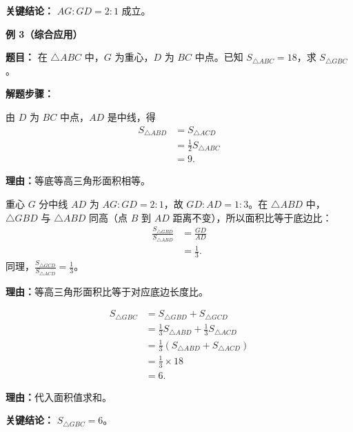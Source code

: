 \begin{examplebox}
	\textbf{\textcolor{CExample}{关键结论：}}
	\(AG:GD=2:1\) 成立。

	\medskip
	\textbf{\textcolor{CExample}{例 3（综合应用）}}

	\textbf{\textcolor{CExample}{题目：}}
	在 \(\triangle ABC\) 中，\(G\) 为重心，\(D\) 为 \(BC\) 中点。已知 \(S_{\triangle ABC}=18\)，求 \(S_{\triangle GBC}\)。

	\textbf{\textcolor{CExample}{解题步骤：}}
	\begin{description}[style=nextline, leftmargin=2.8em, labelsep=0.5em, itemsep=0.45em]
		\item[\textbf{第一步（中线分面积）：}] 由 \(D\) 为 \(BC\) 中点，\(AD\) 是中线，得
		      \[
			      \begin{aligned}
				      S_{\triangle ABD} & = S_{\triangle ACD}         \\
				                        & = \frac12 S_{\triangle ABC} \\
				                        & = 9.
			      \end{aligned}
		      \]
		      \par\textbf{理由：}等底等高三角形面积相等。
		\item[\textbf{第二步（利用重心比例）：}] 重心 \(G\) 分中线 \(AD\) 为 \(AG:GD=2:1\)，故 \(GD:AD=1:3\)。在 \(\triangle ABD\) 中，\(\triangle GBD\) 与 \(\triangle ABD\) 同高（点 \(B\) 到 \(AD\) 距离不变），所以面积比等于底边比：
		      \[
			      \begin{aligned}
				      \frac{S_{\triangle GBD}}{S_{\triangle ABD}} & = \frac{GD}{AD} \\
				                                                  & = \frac13.
			      \end{aligned}
		      \]
		      同理，\(\frac{S_{\triangle GCD}}{S_{\triangle ACD}} = \frac13\)。
		      \par\textbf{理由：}等高三角形面积比等于对应底边长度比。
		\item[\textbf{第三步（计算所求面积）：}]
		      \[
			      \begin{aligned}
				      S_{\triangle GBC} & = S_{\triangle GBD} + S_{\triangle GCD}                 \\
				                        & = \frac13 S_{\triangle ABD} + \frac13 S_{\triangle ACD} \\
				                        & = \frac13 (S_{\triangle ABD} + S_{\triangle ACD})       \\
				                        & = \frac13 \times 18                                     \\
				                        & = 6.
			      \end{aligned}
		      \]
		      \par\textbf{理由：}代入面积值求和。
	\end{description}

	\textbf{\textcolor{CExample}{关键结论：}}
	\(S_{\triangle GBC}=6\)。
\end{examplebox}